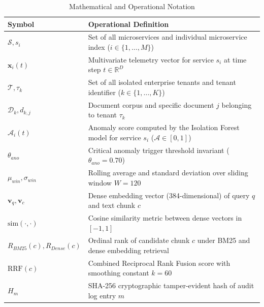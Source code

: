 \documentclass[12pt,onecolumn,draftclsnofoot]{IEEEtran}
\begin{document}
\begin{table}[ht]
\caption{Mathematical and Operational Notation}
\centering
\small
\begin{tabular}{ll}
\toprule
\textbf{Symbol} & \textbf{Operational Definition} \\
\midrule
$\mathcal{S}, s_i$ & Set of all microservices and individual microservice index ($i \in \{1, \dots, M\}$) \\
$\mathbf{x}_i(t)$ & Multivariate telemetry vector for service $s_i$ at time step $t \in \mathbb{R}^D$ \\
$\mathcal{T}, \tau_k$ & Set of all isolated enterprise tenants and tenant identifier ($k \in \{1, \dots, K\}$) \\
$\mathcal{D}_k, d_{k,j}$ & Document corpus and specific document $j$ belonging to tenant $\tau_k$ \\
$\mathcal{A}_i(t)$ & Anomaly score computed by the Isolation Forest model for service $s_i$ ($\mathcal{A} \in [0, 1]$) \\
$\theta_{ano}$ & Critical anomaly trigger threshold invariant ($\theta_{ano} = 0.70$) \\
$\mu_{win}, \sigma_{win}$ & Rolling average and standard deviation over sliding window $W = 120$ \\
$\mathbf{v}_q, \mathbf{v}_c$ & Dense embedding vector (384-dimensional) of query $q$ and text chunk $c$ \\
$\text{sim}(\cdot, \cdot)$ & Cosine similarity metric between dense vectors in $[-1, 1]$ \\
$R_{BM25}(c), R_{Dense}(c)$ & Ordinal rank of candidate chunk $c$ under BM25 and dense embedding retrieval \\
$\text{RRF}(c)$ & Combined Reciprocal Rank Fusion score with smoothing constant $k = 60$ \\
$H_m$ & SHA-256 cryptographic tamper-evident hash of audit log entry $m$ \\
\bottomrule
\end{tabular}
\end{table}
\end{document}
